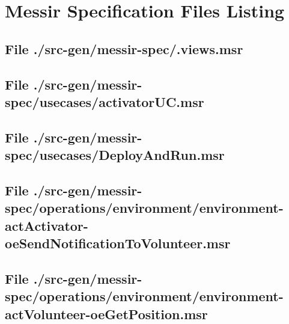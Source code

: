 \chapter{Messir Specification Files Listing}

\section[File /src-gen/messir-spec/.views.msr]{File ./src-gen/messir-spec/.views.msr}
\scriptsize

\normalsize
	
\section[File /src-gen/messir-spec/usecases/activatorUC.msr]{File ./src-gen/messir-spec/usecases/activatorUC.msr}
\scriptsize

\normalsize
	
\section[File /src-gen/messir-spec/usecases/DeployAndRun.msr]{File ./src-gen/messir-spec/usecases/DeployAndRun.msr}
\scriptsize

\normalsize
	
\section[File /src-gen.../environment-actActivator-oeSendNotificationToVolunteer.msr]{File ./src-gen/messir-spec/operations/environment/environment-actActivator-oeSendNotificationToVolunteer.msr}
\scriptsize

\normalsize
	
\section[File /src-gen/messir-spec.../environment-actVolunteer-oeGetPosition.msr]{File ./src-gen/messir-spec/operations/environment/environment-actVolunteer-oeGetPosition.msr}
\scriptsize

\normalsize
	
